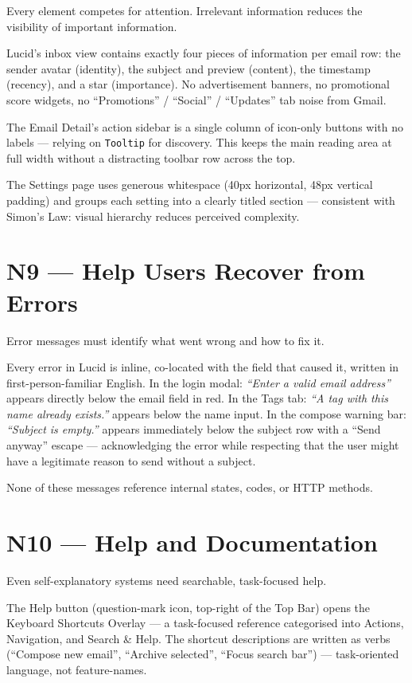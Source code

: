 \documentclass[12pt,a4paper]{report}
\begin{document}
Every element competes for attention. Irrelevant information reduces the visibility of important information.

Lucid's inbox view contains exactly four pieces of information per email row:
the sender avatar (identity), the subject and preview (content), the timestamp (recency),
and a star (importance). No advertisement banners, no promotional score widgets, no
``Promotions'' / ``Social'' / ``Updates'' tab noise from Gmail.

The Email Detail's action sidebar is a single column of icon-only buttons with no labels —
relying on \texttt{Tooltip} for discovery. This keeps the main reading area at full width
without a distracting toolbar row across the top.

The Settings page uses generous whitespace (40px horizontal, 48px vertical padding) and
groups each setting into a clearly titled section — consistent with Simon's Law: visual
hierarchy reduces perceived complexity.

\section{N9 — Help Users Recover from Errors}

Error messages must identify what went wrong and how to fix it.

Every error in Lucid is inline, co-located with the field that caused it, written in
first-person-familiar English. In the login modal: \textit{``Enter a valid email address''}
appears directly below the email field in \textcolor{danger}{red}. In the Tags tab:
\textit{``A tag with this name already exists.''} appears below the name input.
In the compose warning bar: \textit{``Subject is empty.''} appears immediately below the subject
row with a ``Send anyway'' escape — acknowledging the error while respecting that the user
might have a legitimate reason to send without a subject.

None of these messages reference internal states, codes, or HTTP methods.

\section{N10 — Help and Documentation}

Even self-explanatory systems need searchable, task-focused help.

The Help button (question-mark icon, top-right of the Top Bar) opens the Keyboard Shortcuts
Overlay — a task-focused reference categorised into Actions, Navigation, and Search \& Help.
The shortcut descriptions are written as verbs (``Compose new email'', ``Archive selected'',
``Focus search bar'') — task-oriented language, not feature-names.
\end{document}
